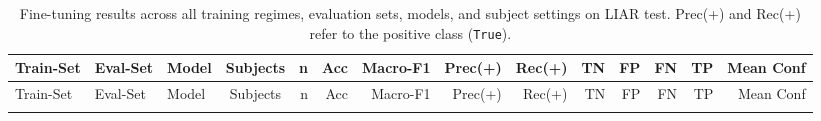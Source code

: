 \begin{landscape}
\scriptsize
\setlength{\tabcolsep}{3pt}
\renewcommand{\arraystretch}{1.05}

\begin{longtable}{@{}l l p{3.6cm} c r r r r r r r r r r@{}}
\caption{Fine-tuning results across all training regimes, evaluation sets, models, and subject settings on LIAR test. Prec(+) and Rec(+) refer to the positive class (\texttt{True}).}
\label{tab:finetune_all_results}\\
\toprule
Train-Set & Eval-Set & Model & Subjects & n & Acc & Macro-F1 & Prec(+) & Rec(+) & TN & FP & FN & TP & Mean Conf \\
\midrule
\endfirsthead

\toprule
Train-Set & Eval-Set & Model & Subjects & n & Acc & Macro-F1 & Prec(+) & Rec(+) & TN & FP & FN & TP & Mean Conf \\
\midrule
\endhead

\bottomrule
\endfoot


\end{longtable}
\end{landscape}
